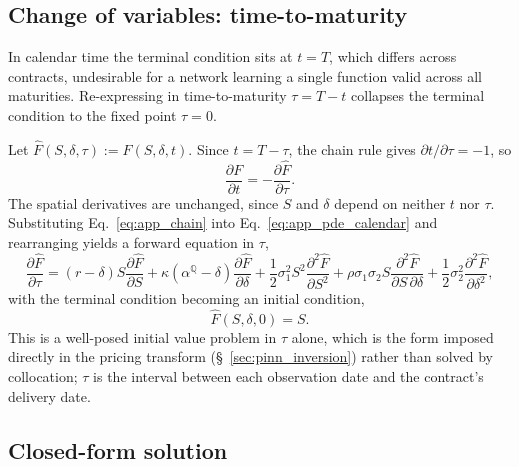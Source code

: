 \documentclass[11pt, a4paper]{article}
\newcommand{\convyield}{\delta}             %
\newcommand{\meanrev}{\kappa}               %
\newcommand{\longrun}{\alpha}               %
\begin{document}
\subsection{Change of variables: time-to-maturity}

In calendar time the terminal condition sits at $t = T$, which differs across contracts, undesirable for a network learning a single function valid across all maturities. Re-expressing in time-to-maturity $\tau = T - t$ collapses the terminal condition to the fixed point $\tau = 0$.

Let $\hat{F}(S, \convyield, \tau) := F(S, \convyield, t)$. Since $t = T - \tau$, the chain rule gives $\partial t/\partial \tau = -1$, so
\begin{equation}
  \label{eq:app_chain}
  \frac{\partial F}{\partial t} = -\frac{\partial \hat{F}}{\partial \tau}.
\end{equation}
\noindent
The spatial derivatives are unchanged, since $S$ and $\convyield$ depend on neither $t$ nor $\tau$. Substituting Eq.~\ref{eq:app_chain} into Eq.~\ref{eq:app_pde_calendar} and rearranging yields a forward equation in $\tau$,
\begin{equation}
  \label{eq:app_pde_tau}
  \frac{\partial \hat{F}}{\partial \tau}
  = (r - \convyield)S\frac{\partial \hat{F}}{\partial S}
  + \meanrev(\longrun^{\mathbb{Q}} - \convyield)\frac{\partial \hat{F}}{\partial \convyield}
  + \frac{1}{2}\sigma_1^2 S^2\frac{\partial^2 \hat{F}}{\partial S^2}
  + \rho\sigma_1\sigma_2 S\frac{\partial^2 \hat{F}}{\partial S\,\partial \convyield}
  + \frac{1}{2}\sigma_2^2\frac{\partial^2 \hat{F}}{\partial \convyield^2},
\end{equation}
\noindent
with the terminal condition becoming an initial condition,
\begin{equation}
  \label{eq:app_ic}
  \hat{F}(S, \convyield, 0) = S.
\end{equation}
\noindent
This is a well-posed initial value problem in $\tau$ alone, which is the form imposed directly in the pricing transform (\S~\ref{sec:pinn_inversion}) rather than solved by collocation; $\tau$ is the interval between each observation date and the contract's delivery date.

\subsection{Closed-form solution}
\end{document}
